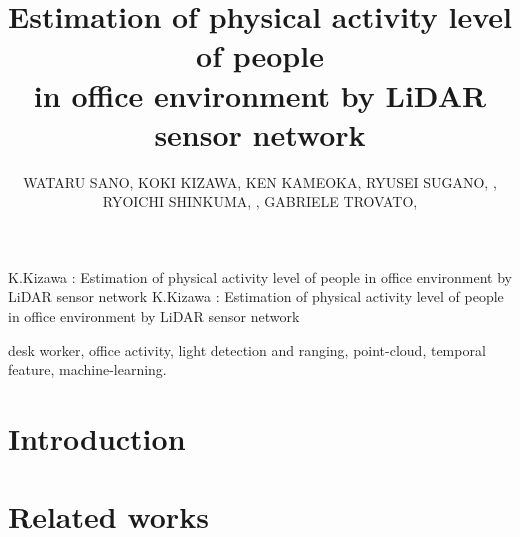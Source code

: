 \documentclass{ieeeaccess}
\begin{document}

\title{Estimation of physical activity level of people \\in office environment by LiDAR sensor network}
\author{
    \uppercase{Wataru Sano},
    \uppercase{Koki Kizawa},
    \uppercase{Ken Kameoka},
    \uppercase{Ryusei Sugano}, ,
    \uppercase{Ryoichi Shinkuma}, ,
    \uppercase{Gabriele Trovato}, 
}

\address[1]{Shibaura Institute of Technology, Tokyo, Japan}
\address[2]{Hyper Digital Twins Co., Ltd., Tokyo, Japan}


\markboth
{K.Kizawa \headeretal: Estimation of physical activity level of people in office environment by LiDAR sensor network}
{K.Kizawa \headeretal: Estimation of physical activity level of people in office environment by LiDAR sensor network}



\begin{abstract}
  
\end{abstract}

\begin{keywords}
desk worker, office activity, light detection and ranging, point-cloud, temporal feature, machine-learning.
\end{keywords}

\titlepgskip=-21pt

\maketitle

\section{Introduction}
\label{sec:introduction}


\section{Related works}
\label{sec:related-works}

\end{document}
